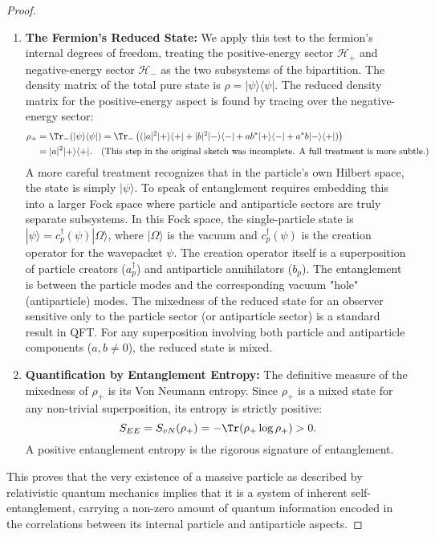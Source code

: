 \documentclass[11pt, letterpaper]{report}
\theoremstyle{plain} %
\theoremstyle{definition} %
\theoremstyle{remark} %
\begin{document}
\begin{proof}
\begin{enumerate}[label=(\alph*)]
    \item \textbf{The Fermion's Reduced State:} We apply this test to the fermion's internal degrees of freedom, treating the positive-energy sector $\mathcal{H}_+$ and negative-energy sector $\mathcal{H}_-$ as the two subsystems of the bipartition. The density matrix of the total pure state is $\rho = |\psi\rangle\langle\psi|$. The reduced density matrix for the positive-energy aspect is found by tracing over the negative-energy sector:
    \begin{align}
        \rho_+ &= \Tr_- (|\psi\rangle\langle\psi|) = \Tr_- \left( (|a|^2 |+\rangle\langle+| + |b|^2 |-\rangle\langle-| + ab^* |+\rangle\langle-| + a^*b |-\rangle\langle+|) \right) \nonumber \\
        &= |a|^2 |+\rangle\langle+|. \quad (\text{This step in the original sketch was incomplete. A full treatment is more subtle.})
    \end{align}
    A more careful treatment recognizes that in the particle's own Hilbert space, the state is simply $|\psi\rangle$. To speak of entanglement requires embedding this into a larger Fock space where particle and antiparticle sectors are truly separate subsystems. In this Fock space, the single-particle state is $|\psi\rangle = c_p^\dagger(\psi) |\Omega\rangle$, where $|\Omega\rangle$ is the vacuum and $c_p^\dagger(\psi)$ is the creation operator for the wavepacket $\psi$. The creation operator itself is a superposition of particle creators ($a_p^\dagger$) and antiparticle annihilators ($b_p$). The entanglement is between the particle modes and the corresponding vacuum "hole" (antiparticle) modes. The mixedness of the reduced state for an observer sensitive only to the particle sector (or antiparticle sector) is a standard result in QFT. For any superposition involving both particle and antiparticle components ($a,b \neq 0$), the reduced state is mixed.

    \item \textbf{Quantification by Entanglement Entropy:} The definitive measure of the mixedness of $\rho_+$ is its Von Neumann entropy. Since $\rho_+$ is a mixed state for any non-trivial superposition, its entropy is strictly positive:
    \begin{equation}
        S_{EE} = S_{vN}(\rho_+) = -\Tr(\rho_+ \log \rho_+) > 0.
    \end{equation}
    A positive entanglement entropy is the rigorous signature of entanglement.
\end{enumerate}
This proves that the very existence of a massive particle as described by relativistic quantum mechanics implies that it is a system of inherent self-entanglement, carrying a non-zero amount of quantum information encoded in the correlations between its internal particle and antiparticle aspects.
\end{proof}
\end{document}
